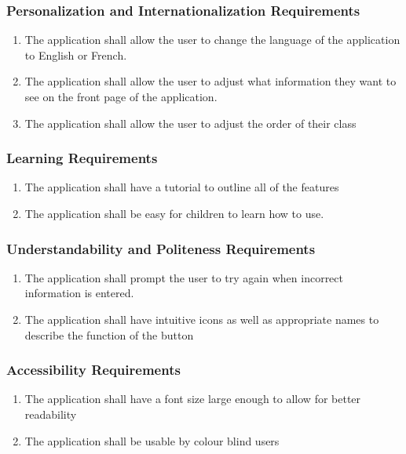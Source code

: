 \documentclass[]{article}
\begin{document}
\subsubsection{Personalization and Internationalization Requirements}
\label{ssub:personalization_and_internationalization_requirements}
\begin{enumerate}[{UH}1. ]
	\item The application shall allow the user to change the language of the
application to English or French.
	\item The application shall allow the user to adjust what information they want
to see on the front page of the application.
	\item The application shall allow the user to adjust the order of their class
\end{enumerate}

\subsubsection{Learning Requirements}
\label{ssub:learning_requirements}
\begin{enumerate}[{UH}1. ]
	\item The application shall have a tutorial to outline all of the features
	\item The application shall be easy for children to learn how to use.
\end{enumerate}

\subsubsection{Understandability and Politeness Requirements}
\label{ssub:understandability_and_politeness_requirements}
\begin{enumerate}[{UH}1. ]
	\item The application shall prompt the user to try again when incorrect information is entered.
	\item The application shall have intuitive icons as well as appropriate names
to describe the function of the button
\end{enumerate}

\subsubsection{Accessibility Requirements}
\label{ssub:accessibility_requirements}
\begin{enumerate}[{UH}1. ]
	\item The application shall have a font size large enough to allow for better readability
	\item The application shall be usable by colour blind users
\end{enumerate}
\end{document}
